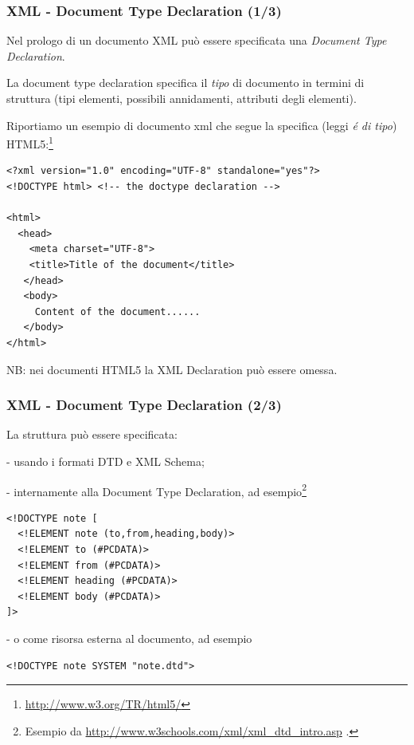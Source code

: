 \documentclass[8pt]{beamer}
\begin{document}
\begin{frame}[fragile]
 \frametitle{XML - Document Type Declaration (1/3)}
Nel prologo di un documento XML pu\`o essere specificata una
\emph{Document Type Declaration}. 
\vspace{\baselineskip}

La document type declaration
specifica il \emph{tipo} di documento in termini di struttura
(tipi elementi, possibili annidamenti, attributi degli elementi).
\vspace{\baselineskip}

Riportiamo un esempio di documento xml che segue la specifica
(leggi \emph{\'e di tipo}) HTML5:\footnote{\url{http://www.w3.org/TR/html5/}}

\begin{small}
\begin{verbatim}
<?xml version="1.0" encoding="UTF-8" standalone="yes"?>
<!DOCTYPE html> <!-- the doctype declaration -->

<html>
  <head>
    <meta charset="UTF-8">
    <title>Title of the document</title>
   </head>
   <body>
     Content of the document......
   </body>
</html> 
\end{verbatim}
\end{small}
\vspace{\baselineskip}

NB: nei documenti HTML5 la XML Declaration pu\`o essere omessa.
\end{frame}

\begin{frame}[fragile]
 \frametitle{XML - Document Type Declaration (2/3)}
 
 La struttura pu\`o essere specificata:
 \vspace{\baselineskip}
 
 - usando i formati DTD e XML Schema;
 \vspace{\baselineskip}

 - internamente alla Document Type Declaration, ad esempio\footnote{Esempio da \url{http://www.w3schools.com/xml/xml_dtd_intro.asp} .}
\begin{small}
\begin{verbatim}
<!DOCTYPE note [
  <!ELEMENT note (to,from,heading,body)>
  <!ELEMENT to (#PCDATA)>
  <!ELEMENT from (#PCDATA)>
  <!ELEMENT heading (#PCDATA)>
  <!ELEMENT body (#PCDATA)>
]> 
\end{verbatim}
\end{small}

 - o come risorsa esterna al documento, ad esempio
\begin{small}
\begin{verbatim}
<!DOCTYPE note SYSTEM "note.dtd">
\end{verbatim}
\end{small}
\end{frame}
\end{document}
